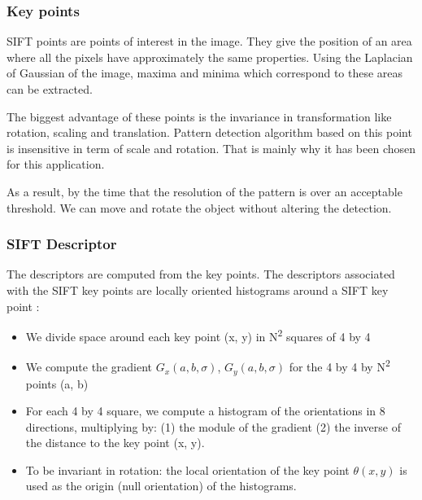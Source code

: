 \documentclass[english,a4paper,11pt]{report}
\newcommand{\ts}{\textsuperscript}
\begin{document}
	\subsubsection{Key points}
	\par SIFT points are points of interest in the image. They give the position of an area where all the pixels have approximately the same properties. Using the Laplacian of Gaussian of the image, maxima and minima which correspond to these areas can be extracted.
	\par The biggest advantage of these points is the invariance in transformation like rotation, scaling and translation. Pattern detection algorithm based on this point is insensitive in term of scale and rotation. That is mainly why it has been chosen for this application.
	\par As a result, by the time that the resolution of the pattern is over an acceptable threshold. We can move and rotate the object without altering the detection.
	
	\subsubsection[Descriptor]{SIFT Descriptor}
	\par The descriptors are computed from the key points. The descriptors associated with the SIFT key points are locally oriented histograms around a SIFT key point \cite{AM}:
	
	\begin{itemize}
			\item We divide space around each key point (x, y) in N\ts{2} squares of 4 by 4 \item We compute the gradient \begin{math}G_{x}(a,b,\sigma)\end{math}, \begin{math}G_{y}(a,b,\sigma)\end{math} for the 4 by 4 by N\ts{2} points (a, b)

		\item For each 4 by 4 square, we compute a histogram of the orientations in 8 directions, multiplying by: (1) the module of the gradient (2) the inverse of the distance to the key point (x, y).
 \item To be invariant in rotation: the local orientation of the key point \begin{math} \theta(x,y) \end{math} is used as the origin (null orientation) of the histograms.		
	\end{itemize}
	
\end{document}
